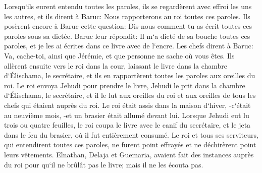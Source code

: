 \verse Lorsqu`ils eurent entendu toutes les paroles, ils se regardèrent avec effroi les uns les autres, et ils dirent à Baruc: Nous rapporterons au roi toutes ces paroles. 
\verse Ils posèrent encore à Baruc cette question: Dis-nous comment tu as écrit toutes ces paroles sous sa dictée. 
\verse Baruc leur répondit: Il m`a dicté de sa bouche toutes ces paroles, et je les ai écrites dans ce livre avec de l`encre. 
\verse Les chefs dirent à Baruc: Va, cache-toi, ainsi que Jérémie, et que personne ne sache où vous êtes. 
\verse Ils allèrent ensuite vers le roi dans la cour, laissant le livre dans la chambre d`Élischama, le secrétaire, et ils en rapportèrent toutes les paroles aux oreilles du roi. 
\verse Le roi envoya Jehudi pour prendre le livre, Jehudi le prit dans la chambre d`Élischama, le secrétaire, et il le lut aux oreilles du roi et aux oreilles de tous les chefs qui étaient auprès du roi. 
\verse Le roi était assis dans la maison d`hiver, -c`était au neuvième mois, -et un brasier était allumé devant lui. 
\verse Lorsque Jehudi eut lu trois ou quatre feuilles, le roi coupa le livre avec le canif du secrétaire, et le jeta dans le feu du brasier, où il fut entièrement consumé. 
\verse Le roi et tous ses serviteurs, qui entendirent toutes ces paroles, ne furent point effrayés et ne déchirèrent point leurs vêtements. 
\verse Elnathan, Delaja et Guemaria, avaient fait des instances auprès du roi pour qu`il ne brûlât pas le livre; mais il ne les écouta pas. 
